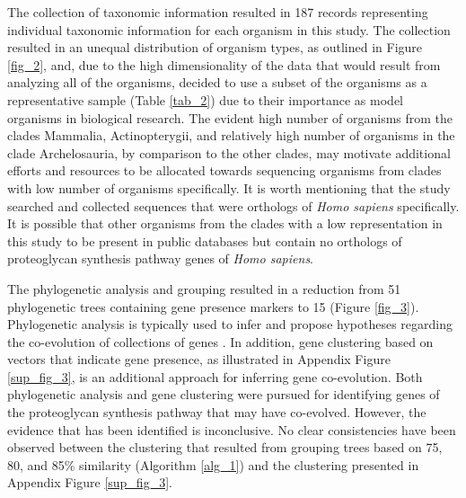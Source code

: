 \documentclass{article}
\begin{document}
The collection of taxonomic information resulted in 187 records representing individual taxonomic information for each organism in this study. The collection resulted in an unequal distribution of organism types, as outlined in Figure \ref{fig_2}, and, due to the high dimensionality of the data that would result from analyzing all of the organisms, decided to use a subset of the organisms as a representative sample (Table \ref{tab_2}) due to their importance as model organisms in biological research. The evident high number of organisms from the clades Mammalia, Actinopterygii, and relatively high number of organisms in the clade Archelosauria, by comparison to the other clades, may motivate additional efforts and resources to be allocated towards sequencing organisms from clades with low number of organisms specifically. It is worth mentioning that the study searched and collected sequences that were orthologs of \textit{Homo sapiens} specifically. It is possible that other organisms from the clades with a low representation in this study to be present in public databases but contain no orthologs of proteoglycan synthesis pathway genes of \textit{Homo sapiens}. 

The phylogenetic analysis and grouping resulted in a reduction from 51 phylogenetic trees containing gene presence markers to 15 (Figure \ref{fig_3}). Phylogenetic analysis is typically used to infer and propose hypotheses regarding the co-evolution of collections of genes \cite{protein_protein}. In addition, gene clustering based on vectors that indicate gene presence, as illustrated in Appendix Figure \ref{sup_fig_3}, is an additional approach for inferring gene co-evolution. Both phylogenetic analysis and gene clustering were pursued for identifying genes of the proteoglycan synthesis pathway that may have co-evolved. However, the evidence that has been identified is inconclusive. No clear consistencies have been observed between the clustering that resulted from grouping trees based on 75, 80, and 85\% similarity (Algorithm \ref{alg_1}) and the clustering presented in Appendix Figure \ref{sup_fig_3}. 
\end{document}
